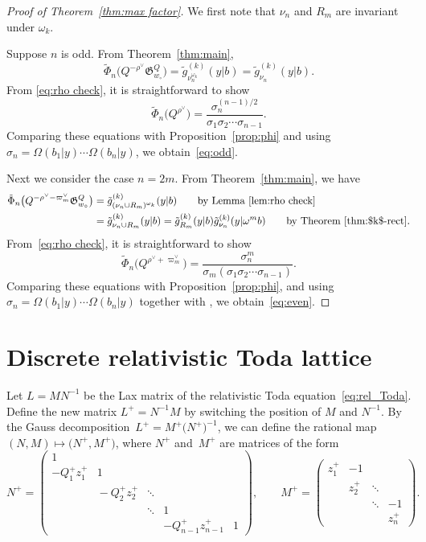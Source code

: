 \documentclass[pdftex]{sigma}
\numberwithin{equation}{section}
\newcommand{\co}{\xi}
\theoremstyle{definition}
\begin{document}
\begin{proof}[Proof of Theorem~\ref{thm:max factor}]
We first note that $\nu_n$
and $R_m$ are invariant under $\omega_k$.

Suppose $n$ is odd.
From Theorem~\ref{thm:main},
\[
\tilde{\Phi}_n\bigl(Q^{-\rho^\lor}\mathfrak{G}_{w_\circ}^Q\bigr)=\tilde{g}_{\nu_n^{\omega_k}}^{(k)}(y|b)=
\tilde{g}_{\nu_n}^{(k)}(y|b).
\]
From
\eqref{eq:rho check}, it is straightforward to show
\[
\tilde{\Phi}_n\bigl(Q^{\rho^\lor}\bigr)=
\frac{\sigma_{n}^{(n-1)/2}}{\sigma_1\sigma_2\cdots \sigma_{n-1}}.
\]
Comparing these equations with
Proposition~\ref{prop:phi}
and using
$\sigma_n=\Omega(b_1|y)\cdots\Omega(b_n|y)$, we obtain~\eqref{eq:odd}.

Next we consider the case
$n=2m$. From Theorem~\ref{thm:main}, we have
\begin{align*}
\tilde{\Phi}_n
\bigl(Q^{-\rho^\lor-\varpi_m^\lor}
\mathfrak{G}_{w_\circ}^Q\bigr)
&=\tilde{g}^{(k)}_{(\nu_n\cup R_m)^{\omega_k}}(y|b)\qquad \text{by Lemma~\ref{lem:rho check}}\\
&=\tilde{g}_{\nu_n\cup R_m}^{(k)}(y|b)=\tilde{g}^{(k)}_{R_m}(y|b)\tilde{g}^{(k)}_{\nu_n}(y|\omega^m b)\qquad\text{by Theorem~\ref{thm:$k$-rect}.}
\end{align*}
From~\eqref{eq:rho check}, it is straightforward to show
\[
\tilde{\Phi}_n\bigl(Q^{\rho^\lor+\varpi_m^\lor}\bigr)=
\frac{\sigma_{n}^m}{\sigma_m(\sigma_1\sigma_2\cdots \sigma_{n-1})}.
\]
Comparing these equations with
Proposition~\ref{prop:phi}, and
using $\sigma_n=\Omega(b_1|y)\cdots\Omega(b_n|y)$ together with
\smash{$\tilde{g}_{R_m}^{(k)}(y|b)=\sigma_m/\co_{R_m}(y)$}, we obtain~\eqref{eq:even}.
\end{proof}

\appendix

\section{Discrete relativistic Toda lattice}\label{sec:Hirotas_bilinear_form}

Let $L=MN^{-1}$ be the Lax matrix of the relativistic Toda equation~\eqref{eq:rel_Toda}.
Define the new matrix $L^+=N^{-1}M$ by switching the position of $M$ and $N^{-1}$.
By the Gauss decomposition~${L^+=M^+\bigl(N^+\bigr)^{-1}}$, we can define the rational map $(N,M)\mapsto \bigl(N^+,M^+\bigr)$, where $N^+$ and~$M^+$ are matrices of the form
\[
N^+=
\begin{pmatrix}
1& \\
-Q^+_1z^+_1 & 1\\
 & \!\!-Q^+_2z^+_2 & \ddots\\
 & & \ddots & 1\\
 & & & -Q^+_{n-1}z^+_{n-1} &1
\end{pmatrix},\qquad
M^+=
\begin{pmatrix}
z^+_1& -1\\
 & z^+_2 &\ddots\\
 & & \ddots & -1\\
 & & & z^+_n
\end{pmatrix}.
\]
\end{document}
